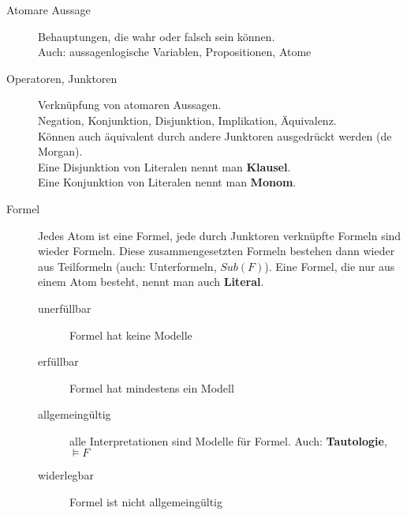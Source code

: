 \documentclass[a4paper,10pt]{article}
\newcommand{\vl}[1]{\colorbox{vl}{\textcolor{white}{\small\textbf{#1}}}}
\newcommand{\f}[1]{\textbf{#1}}
\begin{document}
        \begin{description}
            \item[Atomare Aussage] Behauptungen, die wahr oder falsch sein können. \\ Auch: aussagenlogische Variablen, Propositionen, Atome
            \item[Operatoren, Junktoren] Verknüpfung von atomaren Aussagen. \\ Negation, Konjunktion, Disjunktion, Implikation, Äquivalenz. \\
                Können auch äquivalent durch andere Junktoren ausgedrückt werden (de Morgan). \vl{FS 22} \\
                Eine Disjunktion von Literalen nennt man \f{Klausel}. \\
                Eine Konjunktion von Literalen nennt man \f{Monom}.

            \item[Formel] Jedes Atom ist eine Formel, jede durch Junktoren verknüpfte Formeln sind wieder Formeln.
                Diese zusammengesetzten Formeln bestehen dann wieder aus Teilformeln (auch: Unterformeln, $Sub(F)$).
                Eine Formel, die nur aus einem Atom besteht, nennt man auch \f{Literal}.
                \begin{description}
                    \item[unerfüllbar] Formel hat keine Modelle
                    \item[erfüllbar] Formel hat mindestens ein Modell
                    \item[allgemeingültig] alle Interpretationen sind Modelle für Formel. Auch: \f{Tautologie}, $\models F$
                    \item[widerlegbar] Formel ist nicht allgemeingültig
                \end{description}


\end{description}
\end{document}
